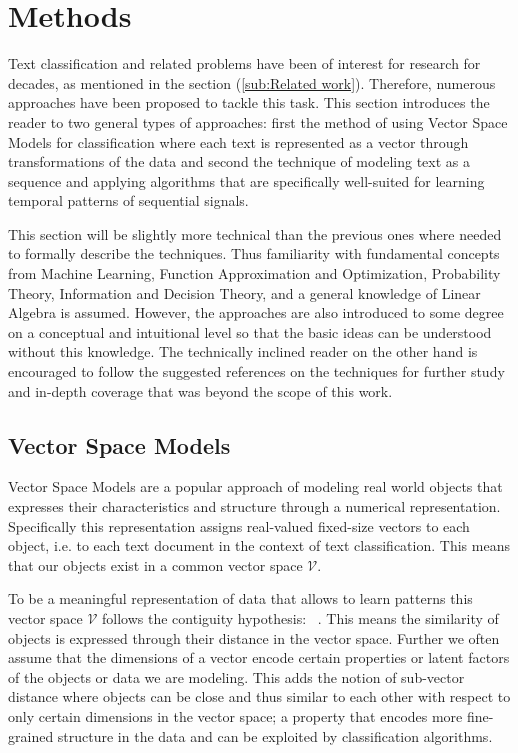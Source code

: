 
\clearpage

\section{Methods}
\label{sec:Methods}

Text classification and related problems have been of interest for research for decades, as mentioned in the  section (\ref{sub:Related work}). Therefore, numerous approaches have been proposed to tackle this task. This section introduces the reader to two general types of approaches: first the method of using Vector Space Models for classification where each text is represented as a vector through transformations of the data and second the technique of modeling text as a sequence and applying algorithms that are specifically well-suited for learning temporal patterns of sequential signals.

This section will be slightly more technical than the previous ones where needed to formally describe the techniques. Thus familiarity with fundamental concepts from Machine Learning, Function Approximation and Optimization, Probability Theory, Information and Decision Theory, and a general knowledge of Linear Algebra is assumed. However, the approaches are also introduced to some degree on a conceptual and intuitional level so that the basic ideas can be understood without this knowledge. The technically inclined reader on the other hand is encouraged to follow the suggested references on the techniques for further study and in-depth coverage that was beyond the scope of this work.

\subsection{Vector Space Models}
\label{sub:Vector Space Models}

Vector Space Models are a popular approach of modeling real world objects that expresses their characteristics and structure through a numerical representation. Specifically this representation assigns real-valued fixed-size vectors to each object, i.e. to each text document in the context of text classification. This means that our objects exist in a common vector space $\mathcal{V}$.

To be a meaningful representation of data that allows to learn patterns this vector space $\mathcal{V}$ follows the contiguity hypothesis: ~\cite[Chapter 14, p.~289]{Manning:2008aa}. This means the similarity of objects is expressed through their distance in the vector space. Further we often assume that the dimensions of a vector encode certain properties or latent factors of the objects or data we are modeling. This adds the notion of sub-vector distance where objects can be close and thus similar to each other with respect to only certain dimensions in the vector space; a property that encodes more fine-grained structure in the data and can be exploited by classification algorithms.

